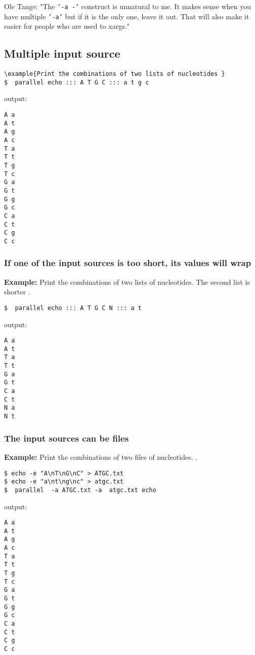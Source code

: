 \documentclass{article}
\newcommand{\example}[1]{
\textbf{Example: } {\color[rgb]{0,0,1} #1 } .
}
\newcommand{\cmdoption}[1]{\texttt{'#1'}}
\begin{document}
Ole Tange: "The \cmdoption{-a -} construct is unnatural to me. It makes sense when you have
multiple \cmdoption{-a} but if it is the only one, leave it out. That will also make
it easier for people who are used to xargs."

\subsection{Multiple input source}


\begin{lstlisting}
\example{Print the combinations of two lists of nucleotides }
$  parallel echo ::: A T G C ::: a t g c
\end{lstlisting}
output:
\begin{lstlisting}
A a
A t
A g
A c
T a
T t
T g
T c
G a
G t
G g
G c
C a
C t
C g
C c
\end{lstlisting}

\subsubsection{If one of the input sources is too short, its values will wrap}
\example{Print the combinations of two lists of nucleotides. The second list is shorter }
\begin{lstlisting}
$  parallel echo ::: A T G C N ::: a t
\end{lstlisting}

output:
\begin{lstlisting}
A a
A t
T a
T t
G a
G t
C a
C t
N a
N t
\end{lstlisting}

\subsubsection{The input sources can be files}
\example{Print the combinations of two files of nucleotides. }
\begin{lstlisting}
$ echo -e "A\nT\nG\nC" > ATGC.txt
$ echo -e "a\nt\ng\nc" > atgc.txt
$  parallel  -a ATGC.txt -a  atgc.txt echo
\end{lstlisting}
output:
\begin{lstlisting}
A a
A t
A g
A c
T a
T t
T g
T c
G a
G t
G g
G c
C a
C t
C g
C c
\end{lstlisting}
\end{document}
